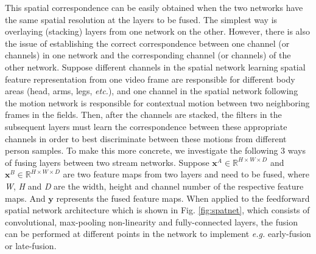 \documentclass[journal]{IEEEtran}
\begin{document}
This spatial correspondence can be easily obtained when the two networks have the same spatial resolution at the layers to be fused. The  simplest way is overlaying (stacking) layers from one network on the other. However, there is also the issue of establishing the correct correspondence between one channel (or channels) in one network and the corresponding channel (or channels) of the other network. Suppose different channels in the spatial network learning spatial feature representation from one video frame are responsible for different body areas (head, arms, legs, \textit{etc.}), and one channel in the spatial network following the motion network is responsible for contextual motion between two neighboring frames in the fields. Then, after the channels are stacked, the filters in the subsequent layers must learn the correspondence between these appropriate channels  in order to best discriminate between these motions from different person samples.
To make this more concrete, we investigate the following 3 ways of fusing layers between two stream networks. Suppose  $\textbf{x}^{A} \in \mathbb{R}^{H \times W \times D}$ and $\textbf{x}^{B} \in \mathbb{R}^{H \times W \times D}$ are two feature maps from two layers and need to be fused, where \textit{W}, \textit{H} and \textit{D} are the width, height and channel number of the respective feature maps. And $\textbf{y} $ represents the fused feature maps. When applied to the feedforward spatial network architecture which is shown in Fig. \ref{fig:spatnet}, which consists of convolutional, max-pooling non-linearity and fully-connected layers, the fusion can be performed at different points in the network to implement \textit{e.g.} early-fusion or late-fusion. 
\end{document}
